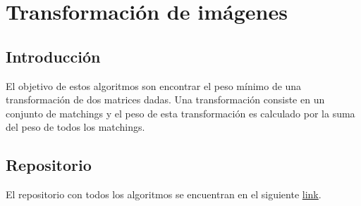 \documentclass[12pt]{article}
\begin{document}






\section{Transformación de imágenes}
\subsection*{Introducción}
El objetivo de estos algoritmos son encontrar el peso mínimo de una transformación de dos matrices dadas. Una transformación consiste en un conjunto de matchings y el peso de esta transformación es calculado por la suma del peso de todos los matchings.







\subsection*{Repositorio}
El repositorio con todos los algoritmos se encuentran en el siguiente \href{https://github.com/Guillermo598/ProyectoADA}{link}.
\end{document}
